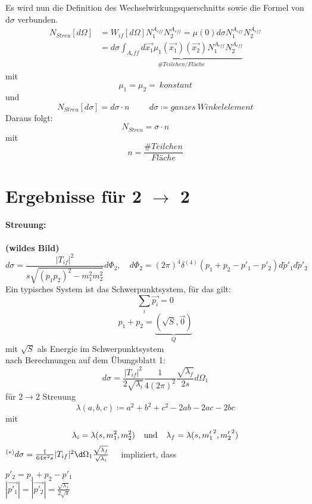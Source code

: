 Es wird nun die Definition des Wechselwirkungsquerschnitts sowie die Formel von 
d$\sigma$ verbunden. \\
\begin{align*}
N_{Streu} \left[ d\Omega \right] &= W_{if} \left[ d\Omega \right] N_1^{A_{eff}} 
N_2^{A_{eff}} = \mu\left( 0 \right) d\sigma N_1^{A_{eff}} N_2^{A_{eff}} \\
&= d\sigma \underbrace{\int_{A_eff} d\vec{x_1} \mu_1 \left( \vec{x_1} \right) 
\left( \vec{x_2} \right) N_1^{A_{eff}} N_2^{A_{eff}}}_{\# Teilchen/Fläche}
\end{align*}
mit \[ \mu_1 = \mu_2 =\ \mathit{konstant} \] 
und
\[ N_{Streu} \left[ d\sigma \right] = d\sigma \cdot n \hspace{1cm} d\sigma 
\coloneqq \mathit{ganzes\ Winkelelement} \]
Daraus folgt: \[ N_{Streu} = \sigma \cdot n \hspace{1cm} \]
mit \[ n = \frac{\# Teilchen}{Fläche} \]

\section{Ergebnisse für 2 $\to$ 2}

\textbf{Streuung:} \\
\\
\textbf{(wildes Bild)}\\

\[ d\sigma = \frac{|T_{if}|^2}{s \sqrt{(p_1 p_2)^2-m_1^2 m_2^2}} d \Phi_2, 
\quad   d \Phi_2 = (2 \pi)^4 \delta^{(4)}(p_1+p_2-p'_1-p'_2) d \tilde{p}'_1 d 
\tilde{p}'_2 \]
Ein typisches System ist das Schwerpunktsystem, für das gilt:
\[ \sum_i \vec{p_i} = 0 \]
\[ p_1+p_2 = \underbrace{(\sqrt{S}, \vec{0})}_Q \] 
mit $\sqrt{S}$ als Energie im Schwerpunktsystem \\
nach Berechnungen auf dem Übungsblatt 1: 
\[ d \sigma = \frac{|T_{if}|^2}{2 \sqrt{\lambda_i}} \frac{1}{4 (2 \pi)^2} 
\frac{\sqrt{\lambda_f}}{2s} d \Omega_1 \]
für $2 \rightarrow 2$ Streuung \\
\[ \lambda(a,b,c) \coloneqq a^2+b^2+c^2-2ab-2ac-2bc \]
mit 
\[ \lambda_i = \lambda(s, m_1^2, m_2^2) \hspace{0.25cm} \textrm{ und } 
\hspace{0.25cm} \lambda_f = \lambda(s, {m'_1}^2, {m'_2}^2) \]
$ ^{(*)} d \sigma = \frac{1}{64 \pi^2 s} |T_{if}|^2 \d \Omega_1 
\frac{\sqrt{\lambda_f}}{\sqrt{\lambda_i}} \quad $  impliziert, dass 
\hspace{1cm}  \parbox{3cm}{ \vspace{2em} $p'_2= p_1+ p_2 -p'_1$ \\ 
$|\vec{p'_1}|=|\vec{p'_2}|= \frac{\sqrt{\lambda_f}}{2 \sqrt{s}}$} \\

